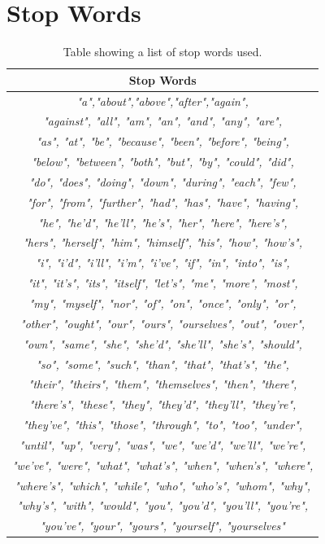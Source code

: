\documentclass[10pt, twocolumn]{article}
\begin{document}
\section{Stop Words}
\label{app:stopwords}
%
\begin{table}[H]
\centering
\caption{Table showing a list of stop words used.}
\label{tbl:StopWordsTable}
\begin{tabular}{|c|}
\hline
\textbf{Stop Words}                                                    \\ \hline
\textit{"a","about","above","after","again",}                          \\
\textit{"against", "all", "am", "an", "and", "any", "are",}            \\
\textit{"as", "at", "be", "because", "been", "before", "being",}       \\
\textit{"below", "between", "both", "but", "by", "could", "did",}      \\
\textit{"do", "does", "doing", "down", "during", "each", "few",}       \\
\textit{"for", "from", "further", "had", "has", "have", "having",}     \\
\textit{"he", "he'd", "he'll", "he's", "her", "here", "here's",}       \\
\textit{"hers", "herself", "him", "himself", "his", "how", "how's",}   \\
\textit{"i", "i'd", "i'll", "i'm", "i've", "if", "in", "into", "is",}  \\
\textit{"it", "it's", "its", "itself", "let's", "me", "more", "most",} \\
\textit{"my", "myself", "nor", "of", "on", "once", "only", "or",}      \\
\textit{"other", "ought", "our", "ours", "ourselves", "out", "over",}  \\
\textit{"own", "same", "she", "she'd", "she'll", "she's", "should",}   \\
\textit{"so", "some", "such", "than", "that", "that's", "the",}        \\
\textit{"their", "theirs", "them", "themselves", "then", "there",}     \\
\textit{"there's", "these", "they", "they'd", "they'll", "they're",}   \\
\textit{"they've", "this", "those", "through", "to", "too", "under",}  \\
\textit{"until", "up", "very", "was", "we", "we'd", "we'll", "we're",} \\
\textit{"we've", "were", "what", "what's", "when", "when's", "where",} \\
\textit{"where's", "which", "while", "who", "who's", "whom", "why",}   \\
\textit{"why's", "with", "would", "you", "you'd", "you'll", "you're",} \\
\textit{"you've", "your", "yours", "yourself", "yourselves"}           \\ \hline
\end{tabular}
\end{table}
\end{document}
